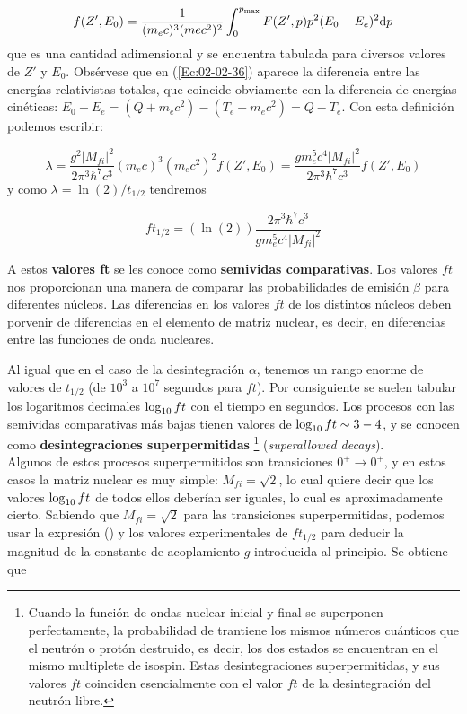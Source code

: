 \begin{equation}
	f(Z',E_0) = \frac{1}{(m_ec)^3(mec^2)^2} \int_0^{p_{\max}} F(Z',p) p^2 (E_0-E_e)^2 \mathrm{d} p\label{Ec:02-02-36}
\end{equation} 
que es una cantidad adimensional y se encuentra tabulada para diversos valores de $Z'$ y $E_0$. Obsérvese que en (\ref{Ec:02-02-36}) aparece la diferencia entre las energías relativistas totales, que coincide obviamente con la diferencia de energías cinéticas: $E_0 - E_e = (Q+m_ec^2)-(T_e+m_ec^2)=Q-T_e$. Con esta definición podemos escribir:

\begin{equation}
	\lambda = \frac{g^2 |M_{fi}|^2}{2\pi^3 \hbar^7 c^3} (m_ec)^3 (m_ec^2)^2 f(Z',E_0) =\frac{g m_e^5 c^4 |M_{fi}|^2}{2\pi^3 \hbar^7 c^3} f(Z',E_0) 
\end{equation}
y como $\lambda= \ln(2)/t_{1/2}$ tendremos

\begin{mybox}
\begin{equation}
	ft_{1/2} = (\ln(2)) \frac{2\pi^3 \hbar^7 c^3}{g m_e^5 c^4 |M_{fi}|^2}
\end{equation}
\end{mybox}
A estos \textbf{valores ft} se les conoce como \textbf{semividas comparativas}. Los valores $ft$ nos proporcionan una manera de comparar las probabilidades de emisión $\beta$ para diferentes núcleos. Las diferencias en los valores $ft$ de los distintos núcleos deben porvenir de diferencias en el elemento de matriz nuclear, es decir, en diferencias entre las funciones de onda nucleares.

Al igual que en el caso de la desintegración $\alpha$, tenemos un rango enorme de valores de $t_{1/2}$ (de $10^3$ a $10^7$ segundos para $ft$). Por consiguiente se suelen tabular los logaritmos decimales $\log_{10} ft$ con el tiempo en segundos. Los procesos con las semividas comparativas más bajas tienen valores de $\log_{10} ft \sim 3-4$, y se conocen como \textbf{desintegraciones superpermitidas} \footnote{Cuando la función de ondas nuclear inicial y final se superponen perfectamente, la probabilidad de trantiene los mismos números cuánticos que el neutrón o protón destruido, es decir, los dos estados se encuentran en el mismo multiplete de isospin. Estas desintegraciones superpermitidas, y sus valores $ft$ coinciden esencialmente con el valor $ft$ de la desintegración del neutrón libre.} (\textit{superallowed decays}). \\


Algunos de estos procesos superpermitidos son transiciones $0^+ \rightarrow 0^+$, y en estos casos la matriz nuclear es muy simple: $M_{fi}=\sqrt{2}$, lo cual quiere decir que los valores $\log_{10} ft$ de todos ellos deberían ser iguales, lo cual es aproximadamente cierto. Sabiendo que $M_{fi}=\sqrt{2}$ para las transiciones superpermitidas, podemos usar la expresión () y los valores experimentales de $ft_{1/2}$ para deducir la magnitud de la constante de acoplamiento $g$ introducida al principio. Se obtiene que

